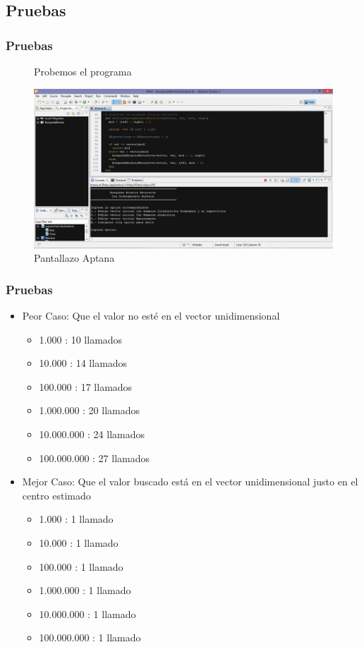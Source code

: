 \documentclass{beamer}
\begin{document}
	\subsection{Pruebas}
	\begin{frame}
		\frametitle{Pruebas}
		\begin{figure}
			\begin{center}
				Probemos el programa 
			\end{center}
  				\centering
    			           \includegraphics[scale=0.25]{Programa.png}
  				\caption{Pantallazo Aptana}
  				\label{fig:lls}
			\end{figure}	
	\end{frame}
	
	\begin{frame}
		\frametitle{Pruebas}
			\begin{itemize}[<+->]		
				\item Peor Caso: Que el valor no esté en el vector unidimensional
					\begin{itemize}[<+->]

\item 1.000			: 10 llamados
\item10.000			: 14 llamados
\item100.000		: 17 llamados
\item1.000.000		: 20 llamados
\item10.000.000		: 24 llamados
\item100.000.000		: 27 llamados
					\end{itemize}
				
				\item Mejor Caso: Que el valor buscado está en el vector unidimensional justo en el centro estimado
					\begin{itemize}[<+->]

\item 1.000			: 1 llamado
\item 10.000			: 1 llamado
\item 100.000		: 1 llamado
\item 1.000.000		: 1 llamado
\item 10.000.000		: 1 llamado
\item 100.000.000		: 1 llamado

					\end{itemize}
			\end{itemize}

  				
	\end{frame}
\end{document}

